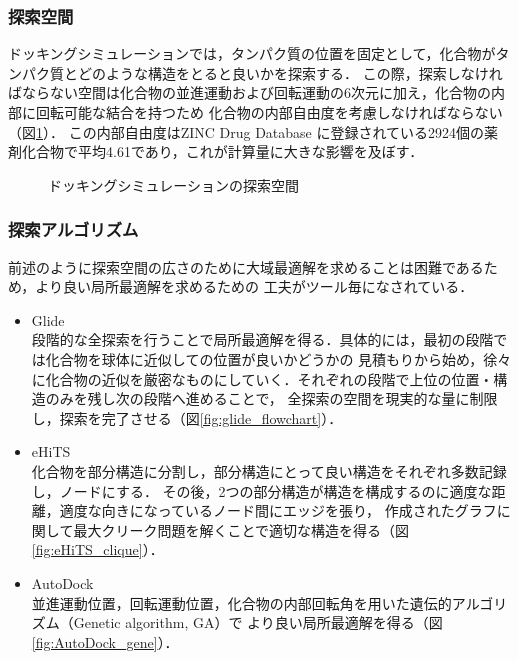 \subsubsection{探索空間}
ドッキングシミュレーションでは，タンパク質の位置を固定として，化合物がタンパク質とどのような構造をとると良いかを探索する．
この際，探索しなければならない空間は化合物の並進運動および回転運動の6次元に加え，化合物の内部に回転可能な結合を持つため
化合物の内部自由度を考慮しなければならない（図\ref{fig:docking_freedom}）．
この内部自由度はZINC Drug Database に登録されている2924個の薬剤化合物で平均4.61であり，これが計算量に大きな影響を及ぼす．

\begin{figure}[tb]
 \begin{center}
  \caption{ドッキングシミュレーションの探索空間}
  \label{fig:docking_freedom}
 \end{center}
\end{figure}


\subsubsection{探索アルゴリズム}
前述のように探索空間の広さのために大域最適解を求めることは困難であるため，より良い局所最適解を求めるための
工夫がツール毎になされている．
\begin{itemize}
\item Glide\cite{Friesner2004}\\
	段階的な全探索を行うことで局所最適解を得る．具体的には，最初の段階では化合物を球体に近似しての位置が良いかどうかの
	見積もりから始め，徐々に化合物の近似を厳密なものにしていく．それぞれの段階で上位の位置・構造のみを残し次の段階へ進めることで，
	全探索の空間を現実的な量に制限し，探索を完了させる（図\ref{fig:glide_flowchart}）．
\item eHiTS\cite{Zsoldos2007}\\
	化合物を部分構造に分割し，部分構造にとって良い構造をそれぞれ多数記録し，ノードにする．
	その後，2つの部分構造が構造を構成するのに適度な距離，適度な向きになっているノード間にエッジを張り，
	作成されたグラフに関して最大クリーク問題を解くことで適切な構造を得る（図\ref{fig:eHiTS_clique}）．
\item AutoDock\cite{Morris2009}\\
	並進運動位置，回転運動位置，化合物の内部回転角を用いた遺伝的アルゴリズム（Genetic algorithm, GA）で
	より良い局所最適解を得る（図\ref{fig:AutoDock_gene}）．
\end{itemize}

